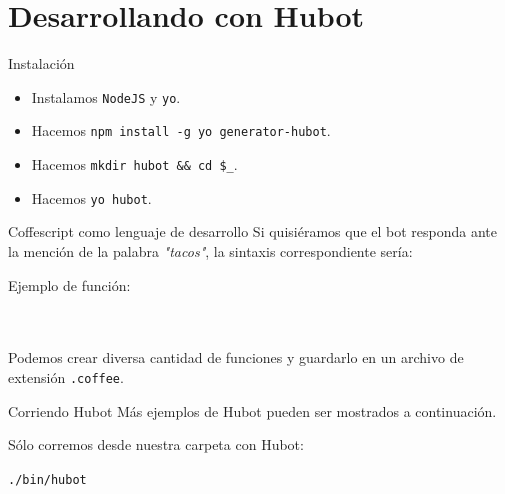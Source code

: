 \documentclass[usenames,dvipsnames]{beamer}
\begin{document}
  \section{Desarrollando con Hubot}
  \begin{frame}{Instalación}
    \begin{itemize}
      \item Instalamos \texttt{NodeJS} y \texttt{yo}.
      \item Hacemos \texttt{npm install -g yo generator-hubot}.
      \item Hacemos \texttt{mkdir hubot \&\& cd \$\_}.
      \item Hacemos \texttt{yo hubot}.
    \end{itemize}
  \end{frame}

  \begin{frame}{Coffescript como lenguaje de desarrollo}
    Si quisiéramos que el bot responda ante la mención de la palabra
    \textit{"tacos"}, la sintaxis correspondiente sería:
    \begin{block}{Ejemplo de función:}
      \\
      \\
      \hspace{0.4cm}{\color{gray} \texttt{}}\\
    \end{block}
    \vspace*{0.5cm}

    Podemos crear diversa cantidad de funciones y guardarlo en un archivo
    de extensión \texttt{.coffee}.
  \end{frame}

  \begin{frame}{Corriendo Hubot}
    Más ejemplos de Hubot pueden ser mostrados a continuación.

    Sólo corremos desde nuestra carpeta con Hubot:\\
    \begin{center}
      \texttt{./bin/hubot}
    \end{center}
  \end{frame}
\end{document}
